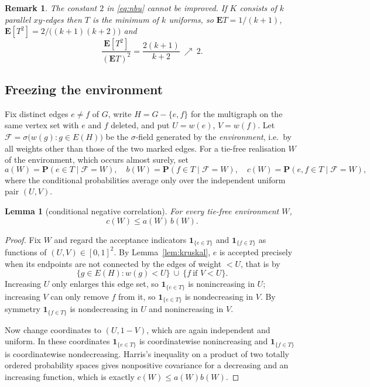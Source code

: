 \documentclass[10pt,a4paper]{amsart}
\newtheorem{lemma}[theorem]{Lemma}
\newtheorem{remark}[theorem]{Remark}
\newcommand{\E}{\mathbf{E}}
\newcommand{\PP}{\mathbf{P}}
\begin{document}
\begin{remark}
\label{rem:sharp2}
The constant $2$ in \eqref{eq:nbu} cannot be improved. If $K$ consists of $k$
parallel $xy$-edges then $T$ is the minimum of $k$ uniforms, so $\E T=1/(k+1)$,
$\E[T^2]=2/\bigl((k+1)(k+2)\bigr)$ and
\[
\frac{\E[T^2]}{(\E T)^2}=\frac{2(k+1)}{k+2}\ \nearrow\ 2 .
\]
\end{remark}

\subsection{Freezing the environment}

Fix distinct edges $e\ne f$ of $G$, write $H=G-\{e,f\}$ for the multigraph on the
same vertex set with $e$ and $f$ deleted, and put $U=w(e)$, $V=w(f)$. Let
$\mathcal{F}=\sigma\bigl(w(g):g\in E(H)\bigr)$ be the $\sigma$-field generated by
the \emph{environment}, i.e.\ by all weights other than those of the two marked
edges. For a tie-free realisation $W$ of the environment, which occurs almost
surely, set
\begin{equation}
\label{eq:abc}
a(W)=\PP(e\in T\mid \mathcal F=W),\quad
b(W)=\PP(f\in T\mid \mathcal F=W),\quad
c(W)=\PP(e,f\in T\mid \mathcal F=W),
\end{equation}
where the conditional probabilities average only over the independent uniform
pair $(U,V)$.

\begin{lemma}[conditional negative correlation]
\label{lem:harris}
For every tie-free environment $W$,
\[
c(W)\le a(W)\,b(W).
\]
\end{lemma}

\begin{proof}
Fix $W$ and regard the acceptance indicators
$\mathbf 1_{\{e\in T\}}$ and $\mathbf 1_{\{f\in T\}}$ as functions of
$(U,V)\in[0,1]^2$. By Lemma~\ref{lem:kruskal}, $e$ is accepted precisely when its
endpoints are not connected by the edges of weight $<U$, that is by
\[
\{g\in E(H):w(g)<U\}\ \cup\ \{f\ \text{if } V<U\}.
\]
Increasing $U$ only enlarges this edge set, so $\mathbf 1_{\{e\in T\}}$ is
nonincreasing in $U$; increasing $V$ can only remove $f$ from it, so
$\mathbf 1_{\{e\in T\}}$ is nondecreasing in $V$. By symmetry
$\mathbf 1_{\{f\in T\}}$ is nondecreasing in $U$ and nonincreasing in $V$.

Now change coordinates to $(U,1-V)$, which are again independent and uniform. In
these coordinates $\mathbf 1_{\{e\in T\}}$ is coordinatewise nonincreasing and
$\mathbf 1_{\{f\in T\}}$ is coordinatewise nondecreasing. Harris's inequality
\cite{Harris} on a product of two totally ordered probability spaces gives
nonpositive covariance for a decreasing and an increasing function, which is
exactly $c(W)\le a(W)b(W)$.
\end{proof}
\end{document}
